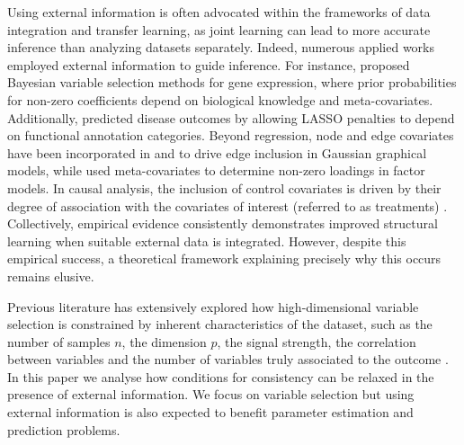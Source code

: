 \documentclass[aos]{imsart}
\theoremstyle{plain}
\begin{document}
Using external information is often advocated within the frameworks of data integration and transfer learning,  as joint learning can lead to more accurate inference than analyzing datasets separately. Indeed, numerous applied works employed external information to guide inference. For instance, \cite{stingo:2011, quintana, cassese:2014} proposed Bayesian variable selection methods for gene expression, where prior probabilities for non-zero coefficients depend on biological knowledge and meta-covariates. Additionally, \cite{chen_tinghuei:2021} predicted disease outcomes by allowing LASSO penalties to depend on functional annotation categories. Beyond regression, node and edge covariates have been incorporated in \cite{peterson} and \cite{jewson2023graphical} to drive edge inclusion in Gaussian graphical models, while \cite{schiavon2022generalized} used meta-covariates to determine non-zero loadings in factor models. In causal analysis, the inclusion of control covariates is driven by their degree of association with the covariates of interest (referred to as treatments) 
\cite{belloni2014inference,antonelli2021bayesian}. Collectively, empirical evidence consistently demonstrates improved structural learning when suitable external data is integrated. However, despite this empirical success, a theoretical framework explaining precisely why this occurs remains elusive.

Previous literature has extensively explored how high-dimensional variable selection is constrained by inherent characteristics of the dataset, such as the number of samples $n$, the dimension $p$, the signal strength, the correlation between variables and the number of variables truly associated to the outcome \cite{buhlmannvandegeerbook,overviewvarsel,handbookbayesvarsel,wainwrighthighdimbook}. In this paper we analyse how conditions for consistency can be relaxed in the presence of external information. We focus on variable selection but using external information is also expected to benefit parameter estimation and prediction problems. 
\end{document}

